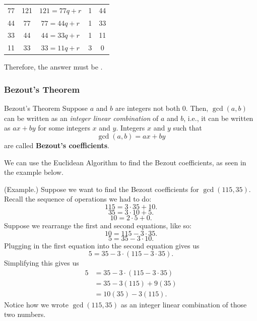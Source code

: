 \documentclass[letterpaper]{article}
\newcommand{\0}{\mathbf{0}}
\begin{document}
\begin{mdframed}
\begin{itemize}
\begin{mdframed}
\begin{center}
\begin{tabular}{|c|c|c|c|c|}
                    \hline 
                    77 & 121 & $121 = 77q + r$ & 1 & 44 \\ 
                    44 & 77 & $77 = 44q + r$ & 1 & 33 \\ 
                    33 & 44 & $44 = 33q + r$ & 1 & 11 \\ 
                    11 & 33 & $33 = 11q + r$ & 3 & 0 \\ 
                    \hline 
                \end{tabular}
            \end{center}
            Therefore, the answer must be .
        \end{mdframed}
    \end{itemize}
\end{mdframed}

\subsubsection{Bezout's Theorem}
\begin{theorem}{Bezout's Theorem}{}
    Suppose $a$ and $b$ are integers not both 0. Then, $\gcd(a, b)$ can be written as an \emph{integer linear combination} of $a$ and $b$, i.e., it can be written as $ax + by$ for some integers $x$ and $y$. Integers $x$ and $y$ such that \[\gcd(a, b) = ax + by\] are called \textbf{Bezout's coefficients}.
\end{theorem}

We can use the Euclidean Algorithm to find the Bezout coefficients, as seen in the example below. 
\begin{mdframed}
    (Example.) Suppose we want to find the Bezout coefficients for $\gcd(115, 35)$. Recall the sequence of operations we had to do:
    \[115 = 3 \cdot 35 + 10.\]
    \[35 = 3 \cdot 10 + 5.\]
    \[10 = 2 \cdot 5 + 0.\]
    Suppose we rearrange the first and second equations, like so: 
    \[10 = 115 - 3 \cdot 35.\] 
    \[5 = 35 - 3 \cdot 10.\]
    Plugging in the first equation into the second equation gives us 
    \[5 = 35 - 3 \cdot (115 - 3 \cdot 35).\]
    Simplifying this gives us 
    \begin{equation*}
        \begin{aligned}
            5 &= 35 - 3 \cdot (115 - 3 \cdot 35) \\ 
                &= 35 - 3(115) + 9(35) \\ 
                &= 10(35) - 3(115).
        \end{aligned}
    \end{equation*}
    Notice how we wrote $\gcd(115, 35)$ as an integer linear combination of those two numbers.
\end{mdframed}
\end{document}

